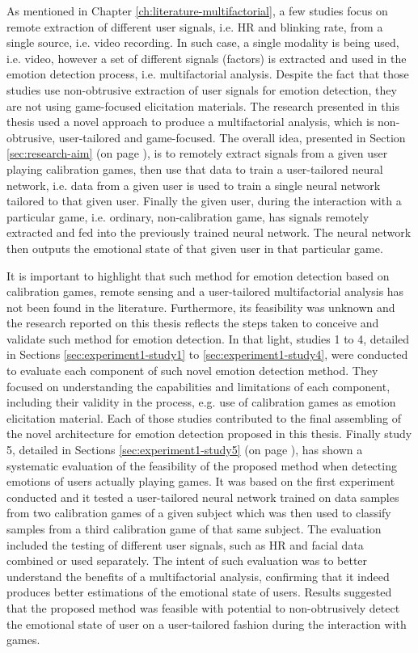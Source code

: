 As mentioned in Chapter \ref{ch:literature-multifactorial}, a few studies focus on remote extraction of different user signals, i.e. HR and blinking rate, from a single source, i.e. video recording. In such case, a single modality is being used, i.e. video, however a set of different signals (factors) is extracted and used in the emotion detection process, i.e. multifactorial analysis. Despite the fact that those studies use non-obtrusive extraction of user signals for emotion detection, they are not using game-focused elicitation materials. The research presented in this thesis used a novel approach to produce a multifactorial analysis, which is non-obtrusive, user-tailored and game-focused. The overall idea, presented in Section \ref{sec:research-aim} (on page \pageref{sec:research-aim}), is to remotely extract signals from a given user playing calibration games, then use that data to train a user-tailored neural network, i.e. data from a given user is used to train a single neural network tailored to that given user. Finally the given user, during the interaction with a particular game, i.e. ordinary, non-calibration game, has signals remotely extracted and fed into the previously trained neural network. The neural network then outputs the emotional state of that given user in that particular game.

It is important to highlight that such method for emotion detection based on calibration games, remote sensing and a user-tailored multifactorial analysis has not been found in the literature. Furthermore, its feasibility was unknown and the research reported on this thesis reflects the steps taken to conceive and validate such method for emotion detection. In that light, studies 1 to 4, detailed in Sections \ref{sec:experiment1-study1} to \ref{sec:experiment1-study4}, were conducted to evaluate each component of such novel emotion detection method. They focused on understanding the capabilities and limitations of each component, including their validity in the process, e.g. use of calibration games as emotion elicitation material. Each of those studies contributed to the final assembling of the novel architecture for emotion detection proposed in this thesis. Finally study 5, detailed in Sections \ref{sec:experiment1-study5} (on page \pageref{sec:experiment1-study5}), has shown a systematic evaluation of the feasibility of the proposed method when detecting emotions of users actually playing games. It was based on the first experiment conducted and it tested a user-tailored neural network trained on data samples from two calibration games of a given subject which was then used to classify samples from a third calibration game of that same subject. The evaluation included the testing of different user signals, such as HR and facial data combined or used separately. The intent of such evaluation was to better understand the benefits of a multifactorial analysis, confirming that it indeed produces better estimations of the emotional state of users. Results suggested that the proposed method was feasible with potential to non-obtrusively detect the emotional state of user on a user-tailored fashion during the interaction with games.

